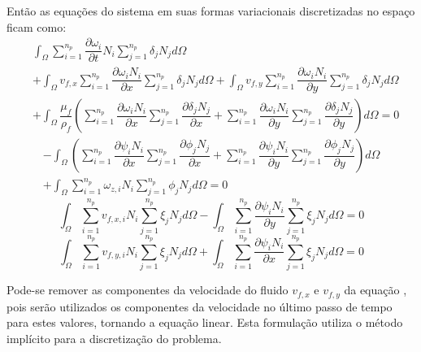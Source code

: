 Então as equações do sistema em suas formas variacionais discretizadas no espaço ficam como:
\begin{align}
    &\int_{\Omega}
    \sum_{i=1}^{n_p} \dfrac{\partial \omega_i}{\partial t} N_i
    \sum_{j=1}^{n_p} \delta_j N_j
    d\Omega \nonumber\\&+
    \int_{\Omega}
    v_{f,x}
    \sum_{i=1}^{n_p} \dfrac{\partial \omega_i N_i}{\partial x}
    \sum_{j=1}^{n_p} \delta_j N_j
    d\Omega +
    \int_{\Omega}
    v_{f,y}
    \sum_{i=1}^{n_p} \dfrac{\partial \omega_i N_i}{\partial y}
    \sum_{j=1}^{n_p} \delta_j N_j
    d\Omega \nonumber\\&+
    \int_{\Omega}
    \dfrac{\mu_f}{\rho_f}
    \left(
    \sum_{i=1}^{n_p} \dfrac{\partial \omega_i N_i}{\partial x}
    \sum_{j=1}^{n_p} \dfrac{\partial \delta_j N_j}{\partial x} +
    \sum_{i=1}^{n_p} \dfrac{\partial \omega_i N_i}{\partial y}
    \sum_{j=1}^{n_p} \dfrac{\partial \delta_j N_j}{\partial y}
    \right) d\Omega= 0
    \label{temp1}
\end{align}
\begin{align}
    -\int_{\Omega}
    \left(
    \sum_{i=1}^{n_p} \dfrac{\partial \psi_i N_i}{\partial x}
    \sum_{j=1}^{n_p} \dfrac{\partial \phi_j N_j}{\partial x} +
    \sum_{i=1}^{n_p} \dfrac{\partial \psi_i N_i}{\partial y}
    \sum_{j=1}^{n_p} \dfrac{\partial \phi_j N_j}{\partial y}
    \right) d\Omega \nonumber\\+
    \int_{\Omega}
    \sum_{i=1}^{n_p} \omega_{z,i} N_i
    \sum_{j=1}^{n_p} \phi_j N_j
    d\Omega = 0
\end{align}
\begin{equation}
    \int_{\Omega}
    \sum_{i=1}^{n_p} v_{f,x,i} N_i
    \sum_{j=1}^{n_p} \xi_j N_j
    d\Omega -
    \int_{\Omega}
    \sum_{i=1}^{n_p} \dfrac{\partial \psi_i N_i}{\partial y}
    \sum_{j=1}^{n_p} \xi_j N_j
    d\Omega = 0
\end{equation}
\begin{equation}
    \int_{\Omega}
    \sum_{i=1}^{n_p} v_{f,y,i} N_i
    \sum_{j=1}^{n_p} \xi_j N_j
    d\Omega +
    \int_{\Omega}
    \sum_{i=1}^{n_p} \dfrac{\partial \psi_i N_i}{\partial x}
    \sum_{j=1}^{n_p} \xi_j N_j
    d\Omega = 0
\end{equation}

Pode-se remover as componentes da velocidade do fluido $v_{f,x}$ e $v_{f,y}$ da equação , pois serão utilizados os componentes da velocidade no último passo de tempo para estes valores, tornando a equação linear.
Esta formulação utiliza o método implícito para a discretização do problema.

